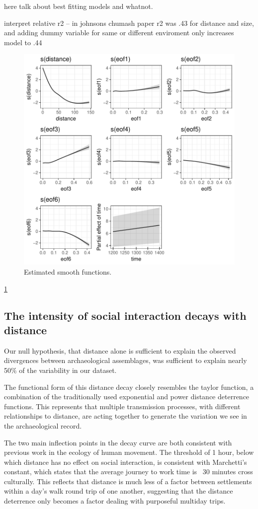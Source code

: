 \documentclass[fleqn,10pt]{wlscirep}
\begin{document}
here talk about best fitting models and whatnot.


interpret relative r2 -- in johnsons chumash paper r2 was .43 for distance and size, and adding dummy variable for same or different enviroment only increases model to .44

\begin{figure}[h]
\centering
\includegraphics[width=.8\linewidth]{figures/smooths.pdf}
\caption{Estimated smooth functions.}
\label{fig:smooths}
\end{figure}

\ref{fig:smooths}

\subsection*{The intensity of social interaction decays with distance}

Our null hypothesis, that distance alone is sufficient to explain the observed divergences between archaeological assemblages, was sufficient to explain nearly 50\% of the variability in our dataset. 

The functional form of this distance decay closely resembles the taylor function, a combination of the traditionally used exponential and power distance deterrence functions. This represents that multiple transmission processes, with different relationships to distance, are acting together to generate the variation we see in the archaeological record.

The two main inflection points in the decay curve are both consistent with previous work in the ecology of human movement. The threshold of 1 hour, below which distance has no effect on social interaction, is consistent with Marchetti's constant, which states that the average journey to work time is ~30 minutes cross culturally. This reflects that distance is much less of a factor between settlements within a day's walk round trip of one another, suggesting that the distance deterrence only becomes a factor dealing with purposeful multiday trips. 
\end{document}
